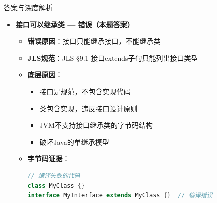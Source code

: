\documentclass[12pt, a4paper]{ctexart}
\begin{document}
\begin{enumerate}[label=\textbf{\arabic*.}]
\begin{bluebox}{答案与深度解析}
\begin{itemize}[leftmargin=*, nosep, label={}]
\begin{itemize}[label={}, leftmargin=*, nosep]
\begin{lstlisting}[language=Java]
// 实现多个接口
class Duck implements Flyable, Runnable, Swimmable {
    @Override
    public void fly() {
        System.out.println("鸭子飞翔");
    }

    @Override
    public void run() {
        System.out.println("鸭子跑");
    }

    @Override
    public void swim() {
        System.out.println("鸭子游泳");
    }
}

// 使用
Duck duck = new Duck();
duck.fly();   // 实现Flyable
duck.run();   // 实现Runnable
duck.swim();  // 实现Swimmable
// 一个类可实现多个接口，弥补单继承局限
					      \end{lstlisting}
				            \item \textbf{默认方法冲突处理}：
				                  \begin{lstlisting}[language=Java]
interface A {
    default void method() {
        System.out.println("A.method");
    }
}

interface B {
    default void method() {
        System.out.println("B.method");
    }
}

// 编译错误：多个默认方法冲突
class C implements A, B {}  // error: 接口A和B都继承了method()

// 解决：显式重写并指定调用
class D implements A, B {
    @Override
    public void method() {
        A.super.method();  // 或 B.super.method()
    }
}
// 多接口实现的默认方法冲突必须显式解决
					      \end{lstlisting}
			            \end{itemize}

			      \item[D] \textbf{接口可以继承类 — 错误（本题答案）}
			            \begin{itemize}[label={}, leftmargin=*, nosep]
				            \item \textbf{错误原因}：接口只能继承接口，不能继承类
				            \item \textbf{JLS规范}：JLS §9.1 接口extends子句只能列出接口类型
				            \item \textbf{底层原因}：
				                  \begin{itemize}[label={}, nosep]
					                  \item 接口是规范，不包含实现代码
					                  \item 类包含实现，违反接口设计原则
					                  \item JVM不支持接口继承类的字节码结构
					                  \item 破坏Java的单继承模型
				                  \end{itemize}
				            \item \textbf{字节码证据}：
				                  \begin{lstlisting}[language=Java]
// 编译失败的代码
class MyClass {}
interface MyInterface extends MyClass {}  // 编译错误


\end{lstlisting}
\end{itemize}
\end{itemize}
\end{bluebox}
\end{enumerate}
\end{document}
